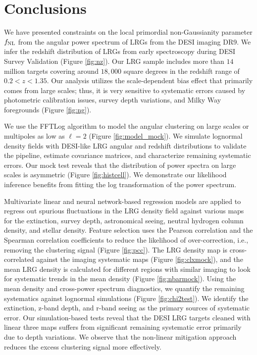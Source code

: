 \section{Conclusions}\label{sec:conclusion}
We have presented constraints on the local primordial non-Gaussianity parameter $f_{\rm NL}$ from the angular power spectrum of LRGs from the DESI imaging DR9. We infer the redshift distribution of LRGs from early spectroscopy during DESI Survey Validation (Figure \ref{fig:nz}). Our LRG sample includes more than $14$ million targets covering around $18,000$ square degrees in the redshift range of $0.2< z < 1.35$. Our analysis utilizes the scale-dependent bias effect that primarily comes from large scales; thus, it is very sensitive to systematic errors caused by photometric calibration issues, survey depth variations, and Milky Way foregrounds (Figure \ref{fig:ng}). 

We use the FFTLog algorithm to model the angular clustering on large scales or multipoles as low as $\ell=2$ (Figure \ref{fig:model_mock}). We simulate lognormal density fields with DESI-like LRG angular and redshift distributions to validate the pipeline, estimate covariance matrices, and characterize remaining systematic errors. Our mock test reveals that the distribution of power spectra on large scales is asymmetric (Figure \ref{fig:histcell}). We demonstrate our likelihood inference benefits from fitting the log transformation of the power spectrum. 

Multivariate linear and neural network-based regression models are applied to regress out spurious fluctuations in the LRG density field against various maps for the extinction, survey depth, astronomical seeing, neutral hydrogen column density, and stellar density. Feature selection uses the Pearson correlation and the Spearman correlation coefficients to reduce the likelihood of over-correction, i.e., removing the clustering signal (Figure \ref{fig:pcc}). The LRG density map is cross-correlated against the imaging systematic maps (Figure \ref{fig:clxmock}), and the mean LRG density is calculated for different regions with similar imaging to look for systematic trends in the mean density (Figure \ref{fig:nbarmock}). Using the mean density and cross-power spectrum diagnostics, we quantify the remaining systematics against lognormal simulations (Figure \ref{fig:chi2test}). We identify the extinction, z-band depth, and r-band seeing as the primary sources of systematic error. Our simulation-based tests reveal that the DESI LRG targets cleaned with linear three maps suffers from significant remaining systematic error primarily due to depth variations. We observe that the non-linear mitigation approach reduces the excess clustering signal more effectively. 

